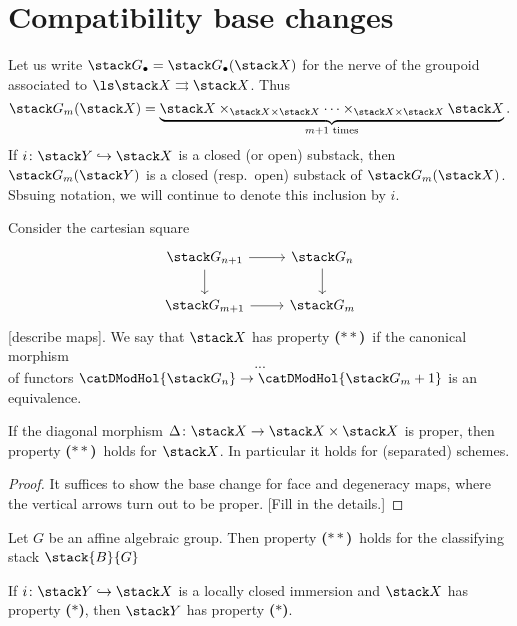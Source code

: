 \documentclass{ck-article}
\newcommand\bc{\textbf{($\mathbf{*}$)}}
\newcommand\hbc{\textbf{($\mathbf{**}$)}}
\newcommand\cs{\stack{B}}
\begin{document}
\section{Compatibility base changes}

Let us write $\stack G_\bullet = \stack G_\bullet(\stack X)$ for the nerve of the groupoid associated to $\ls\stack X \rightrightarrows \stack X$.
Thus
\[
    \stack G_m(\stack X) = \underbrace{\stack X \times_{\stack X \times \stack X} \dotsb \times_{\stack X \times \stack X} \stack X}_{m+1\text{ times}}.
\]
If $i\colon \stack Y \hookrightarrow \stack X$ is a closed (or open) substack, then $\stack G_m(\stack Y)$ is a closed (resp.~open) substack of $\stack G_m(\stack X)$.
Sbsuing notation, we will continue to denote this inclusion by $i$.

\begin{Def}
    Consider the cartesian square
    \[
        \begin{tikzcd}
            \stack G_{n+1} \arrow[r] \arrow[d] & \stack G_n \arrow[d] \\
            \stack G_{m+1} \arrow[r] & \stack G_m
        \end{tikzcd}
    \]
    [describe maps].
    We say that $\stack X$ has property \hbc\ if the canonical morphism
    \[
        ...
    \]
    of functors $\catDModHol{\stack G_n} \to \catDModHol{\stack G_m+1}$ is an equivalence.
\end{Def}

\begin{Lem}
    If the diagonal  morphism $\Delta\colon \stack X \to \stack X \times \stack X$ is proper, then property \hbc\ holds for $\stack X$.
    In particular it holds for (separated) schemes.
\end{Lem}

\begin{proof}
    It suffices to show the base change for face and degeneracy maps, where the vertical arrows turn out to be proper.
    [Fill in the details.]
\end{proof}

\begin{Lem}
    Let $G$ be an affine algebraic group. 
    Then property \hbc\ holds  for the classifying stack $\cs{G}$
\end{Lem}

\begin{Lem}\label{lem:hbc_lc_immersion}
    If $i\colon\stack Y \hookrightarrow \stack X$ is a locally closed immersion and $\stack X$ has property \bc, then $\stack Y$ has property \bc.
\end{Lem}
\end{document}
